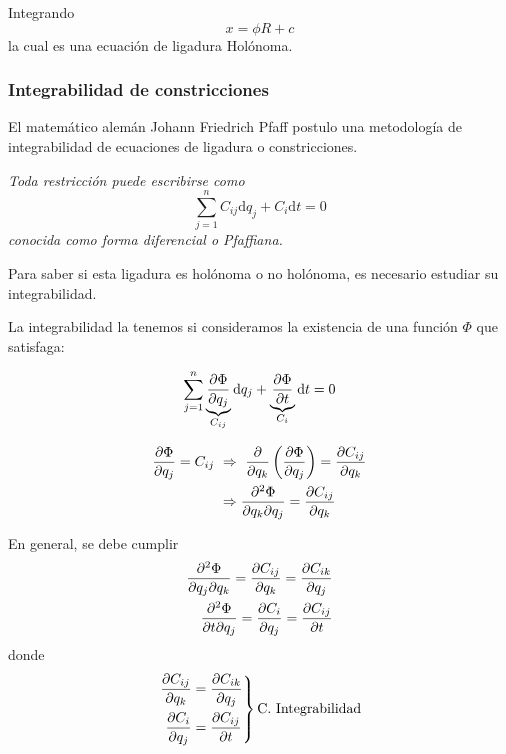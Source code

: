 \documentclass[../main]{subfiles}
\begin{document}
Integrando
\begin{equation*}
    x=\phi R+c
\end{equation*}
la cual es una ecuación de ligadura Holónoma.

\subsubsection{Integrabilidad de constricciones}

El matemático alemán Johann Friedrich Pfaff postulo una metodología de integrabilidad de ecuaciones de ligadura o constricciones.

\textit{Toda restricción puede escribirse como}
\begin{equation}
    \sum_{j=1}^n C_{ij}\mathrm{d}q_j+C_i\mathrm{d}t=0
\end{equation}
\textit{conocida como forma diferencial o Pfaffiana.}

Para saber si esta ligadura es holónoma o no holónoma, es necesario estudiar su integrabilidad.

La integrabilidad la tenemos si consideramos la existencia de una función $\Phi$ que satisfaga:

\begin{equation}
    \sum_{j=1}^n \underbrace{\pdv{\Phi}{q_j}}_{C_{ij}}\mathrm{d}q_j+\underbrace{\pdv{\Phi}{t}}_{C_i}\mathrm{d}t=0 
\end{equation}

\begin{align*}
    \pdv{\Phi}{q_j}=C_{ij} \ &\Rightarrow \ \pdv{}{q_k}\left(\pdv{\Phi}{q_j}\right)=\pdv{C_{ij}}{q_k} \\
    &\Rightarrow \pdv{^2 \Phi}{q_k \partial q_j}=\pdv{C_{ij}}{q_k}
\end{align*}

En general, se debe cumplir
\begin{align}
    \pdv{^2 \Phi}{q_j \partial q_k}=\pdv{C_{ij}}{q_k}=\pdv{C_{ik}}{q_j} \\
    \pdv{^2 \Phi}{t \partial q_j}=\pdv{C_i}{q_j}=\pdv{C_{ij}}{t}
\end{align}
donde
\begin{equation*}
    \left.
    \begin{split}
    \pdv{C_{ij}}{q_k}&=\pdv{C_{ik}}{q_j}  \\
    \pdv{C_i}{q_j}&=\pdv{C_{ij}}{t}
    \end{split}
    \right\}
    \text{C. Integrabilidad}
\end{equation*}
\end{document}
